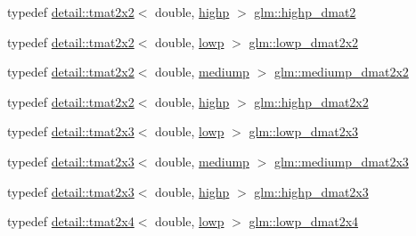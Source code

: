 \begin{DoxyCompactItemize}
typedef \hyperlink{structglm_1_1detail_1_1tmat2x2}{detail\+::tmat2x2}$<$ double, \hyperlink{namespaceglm_a0f04f086094c747d227af4425893f545ac6f7eab42eacbb10d59a58e95e362074}{highp} $>$ \hyperlink{group__core__precision_ga9b158b3b722fe991bb66f7e65f136e68}{glm\+::highp\+\_\+dmat2}
\item 
typedef \hyperlink{structglm_1_1detail_1_1tmat2x2}{detail\+::tmat2x2}$<$ double, \hyperlink{namespaceglm_a0f04f086094c747d227af4425893f545ae161af3fc695e696ce3bf69f7332bc2d}{lowp} $>$ \hyperlink{group__core__precision_ga68b486ff22814c1a3781378513a9fcc0}{glm\+::lowp\+\_\+dmat2x2}
\item 
typedef \hyperlink{structglm_1_1detail_1_1tmat2x2}{detail\+::tmat2x2}$<$ double, \hyperlink{namespaceglm_a0f04f086094c747d227af4425893f545a6416f3ea0c9025fb21ed50c4d6620482}{mediump} $>$ \hyperlink{group__core__precision_ga88ddb4188060ab00fee67c9840f4417e}{glm\+::mediump\+\_\+dmat2x2}
\item 
typedef \hyperlink{structglm_1_1detail_1_1tmat2x2}{detail\+::tmat2x2}$<$ double, \hyperlink{namespaceglm_a0f04f086094c747d227af4425893f545ac6f7eab42eacbb10d59a58e95e362074}{highp} $>$ \hyperlink{group__core__precision_gaa5e35f6570d394c1cd34f411a473220c}{glm\+::highp\+\_\+dmat2x2}
\item 
typedef \hyperlink{structglm_1_1detail_1_1tmat2x3}{detail\+::tmat2x3}$<$ double, \hyperlink{namespaceglm_a0f04f086094c747d227af4425893f545ae161af3fc695e696ce3bf69f7332bc2d}{lowp} $>$ \hyperlink{group__core__precision_ga2c7432984a35cf72050870a54485ef35}{glm\+::lowp\+\_\+dmat2x3}
\item 
typedef \hyperlink{structglm_1_1detail_1_1tmat2x3}{detail\+::tmat2x3}$<$ double, \hyperlink{namespaceglm_a0f04f086094c747d227af4425893f545a6416f3ea0c9025fb21ed50c4d6620482}{mediump} $>$ \hyperlink{group__core__precision_ga734e988edf759c7012c443014acb6674}{glm\+::mediump\+\_\+dmat2x3}
\item 
typedef \hyperlink{structglm_1_1detail_1_1tmat2x3}{detail\+::tmat2x3}$<$ double, \hyperlink{namespaceglm_a0f04f086094c747d227af4425893f545ac6f7eab42eacbb10d59a58e95e362074}{highp} $>$ \hyperlink{group__core__precision_gafec7367665f006f2a7643103c5eddc38}{glm\+::highp\+\_\+dmat2x3}
\item 
typedef \hyperlink{structglm_1_1detail_1_1tmat2x4}{detail\+::tmat2x4}$<$ double, \hyperlink{namespaceglm_a0f04f086094c747d227af4425893f545ae161af3fc695e696ce3bf69f7332bc2d}{lowp} $>$ \hyperlink{group__core__precision_gac2285cef559b0dc35cb9a7f22e6a2dd8}{glm\+::lowp\+\_\+dmat2x4}
\item 

\end{DoxyCompactItemize}
